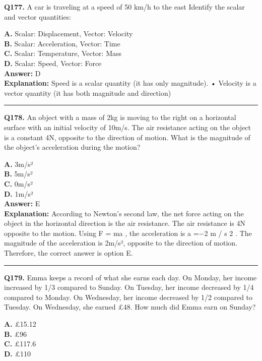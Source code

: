 \documentclass[12pt]{article}
\begin{document}
\noindent
\textbf{Q177.} A car is traveling at a speed of 50 km/h to the east
Identify the scalar and vector quantities:



\textbf{A.} Scalar: Displacement, Vector: Velocity \\
\textbf{B.} Scalar: Acceleration, Vector: Time \\
\textbf{C.} Scalar: Temperature, Vector: Mass \\
\textbf{D.} Scalar: Speed, Vector: Force \\

\textbf{Answer:} D \\
\textbf{Explanation:} Speed is a scalar quantity (it has only magnitude).
• Velocity is a vector quantity (it has both magnitude and direction)

\hrule
\vspace{1em}


\noindent
\textbf{Q178.} An object with a mass of 2kg is moving to the right on a horizontal surface with an initial velocity of 10m/s. The air resistance acting on the object is a constant 4N, opposite to the direction of motion. What is the magnitude of the object's acceleration during the motion?



\textbf{A.} 3m/s² \\
\textbf{B.} 5m/s² \\
\textbf{C.} 0m/s² \\
\textbf{D.} 1m/s² \\

\textbf{Answer:} E \\
\textbf{Explanation:} According to Newton's second law, the net force acting on the object in the horizontal direction is the air resistance. The air resistance is 4N opposite to the motion. Using
F
=
ma
, the acceleration is
a
​=−2
m
/
s
2
. The magnitude of the acceleration is 2m/s², opposite to the direction of motion. Therefore, the correct answer is option E.

\hrule
\vspace{1em}


\noindent
\textbf{Q179.} Emma keeps a record of what she earns each day.
On Monday, her income increased by 1/3 compared to Sunday. On Tuesday, her income decreased by 1/4 compared to Monday. On Wednesday, her income decreased by 1/2 compared to Tuesday.
On Wednesday, she earned £48. How much did Emma earn on Sunday?



\textbf{A.} £15.12 \\
\textbf{B.} £96 \\
\textbf{C.} £117.6 \\
\textbf{D.} £110 \\
\end{document}
